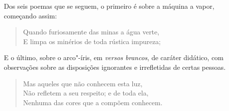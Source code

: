 Dos seis poemas que se seguem, o primeiro é sobre a máquina a vapor,
começando assim:

\begin{verse}
Quando furiosamente das minas a água verte,\\
E limpa os minérios de toda rústica impureza;\footnotemark
\end{verse}

E o último, sobre o arco"-íris, em \textit{versos brancos}, de caráter
didático, com observações sobre as disposições ignorantes e irrefletidas
de certas pessoas.

\begin{verse}
Mas aqueles que não conhecem esta luz,\\
Não refletem a seu respeito; e de toda ela,\\
Nenhuma das cores que a compõem conhecem.\footnotemark
\end{verse}

